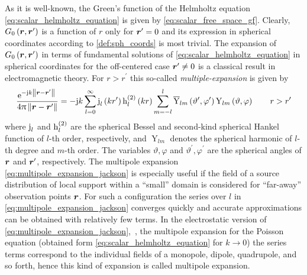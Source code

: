 As it is well-known, the Green's function of the Helmholtz equation
\eqref{eq:scalar_helmholtz_equation} is given by
\eqref{eq:scalar_free_space_gf}.
Clearly, $G_0\left(\robs, \rsrc\right)$ is a function of $r$ only for
$\rsrc = 0$ and its expression in spherical coordinates according to
\cref{def:sph_coords} is most trivial.
The expansion of $G_0\left(\robs, \rsrc\right)$ in terms of fundamental
solutions of \eqref{eq:scalar_helmholtz_equation} in spherical coordinates for
the off-centered case $\rsrc \neq 0$ is a classical result in electromagnetic
theory.
For $r > r^\prime$ this so-called \emph{multiple-expansion} is given by
\cite[492]{Jackson2013}
\begin{equation}\label{eq:multipole_expansion_jackson}
	\frac{\exp{-\im k \rdiffNorm}}{4\pi \rdiffNorm} = 
	-\im k \sum_{l = 0}^{\infty}
	\sphbesselj{l} \left(k r^\prime\right)
	\sphbesselh{2}{l} \left(k r\right)
	\sum_{m = -l}^{l}
	\complexConjugate{\operatorname{Y}}_{l m}
	\left( \vartheta^\prime, \varphi^\prime \right) 
	\operatorname{Y}_{l m}
	\left( \vartheta, \varphi\right)
	\qquad
	r > r^\prime
\end{equation}
where $\sphbesselj{l}$ and $\sphbesselh{2}{l}$ are the spherical Bessel and
second-kind spherical Hankel function of $l$-th order, respectively, and
$\operatorname{Y}_{l m}$ denotes the spherical harmonic of $l$-th degree and
$m$-th order.
The variables $\vartheta, \varphi$ and $\vartheta^\prime, \varphi^\prime$ are
the spherical angles of $\robs$ and $\rsrc$, respectively.
The multipole expansion \eqref{eq:multipole_expansion_jackson} is especially
useful if the field of a source distribution of local support within a
\enquote{small} domain is considered for \enquote{far-away} observation points
$\robs$.
For such a configuration the series over $l$ in
\eqref{eq:multipole_expansion_jackson} converges quickly and accurate
approximations can be obtained with relatively few terms.
In the electrostatic version of \eqref{eq:multipole_expansion_jackson},~\ie,
the multipole expansion for the Poisson equation
(obtained form \eqref{eq:scalar_helmholtz_equation} for $k \to 0$) the series
terms correspond to the individual fields of a monopole, dipole, quadrupole,
and so forth, hence this kind of expansion is called multipole expansion.

